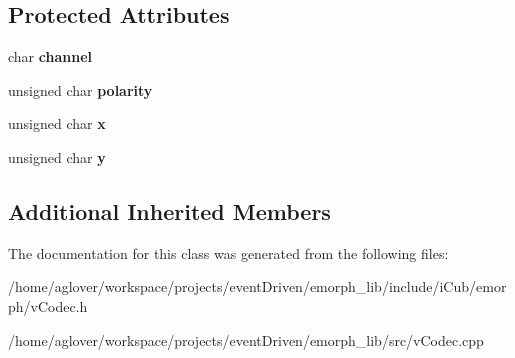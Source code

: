 \subsection*{Protected Attributes}
\begin{DoxyCompactItemize}
\item 
\hypertarget{classemorph_1_1AddressEvent_a425374ba06cfee6d2b44a6f94ff9b2e3}{char {\bfseries channel}}\label{classemorph_1_1AddressEvent_a425374ba06cfee6d2b44a6f94ff9b2e3}

\item 
\hypertarget{classemorph_1_1AddressEvent_ac362a62aa417cee5e40caad8465299d3}{unsigned char {\bfseries polarity}}\label{classemorph_1_1AddressEvent_ac362a62aa417cee5e40caad8465299d3}

\item 
\hypertarget{classemorph_1_1AddressEvent_a4bdcf2b526b12d92a08586dae5efdd80}{unsigned char {\bfseries x}}\label{classemorph_1_1AddressEvent_a4bdcf2b526b12d92a08586dae5efdd80}

\item 
\hypertarget{classemorph_1_1AddressEvent_a1ad1697a4c2460385bd6a266304feec1}{unsigned char {\bfseries y}}\label{classemorph_1_1AddressEvent_a1ad1697a4c2460385bd6a266304feec1}

\end{DoxyCompactItemize}
\subsection*{Additional Inherited Members}


The documentation for this class was generated from the following files\-:\begin{DoxyCompactItemize}
\item 
/home/aglover/workspace/projects/event\-Driven/emorph\-\_\-lib/include/i\-Cub/emorph/v\-Codec.\-h\item 
/home/aglover/workspace/projects/event\-Driven/emorph\-\_\-lib/src/v\-Codec.\-cpp\end{DoxyCompactItemize}
